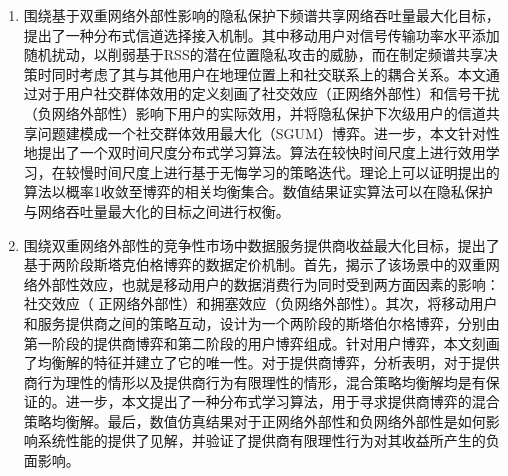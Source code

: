 \begin{enumerate}
   \item 围绕基于双重网络外部性影响的隐私保护下频谱共享网络吞吐量最大化目标，提出了一种分布式信道选择接入机制。其中移动用户对信号传输功率水平添加随机扰动，以削弱基于RSS的潜在位置隐私攻击的威胁，而在制定频谱共享决策时同时考虑了其与其他用户在地理位置上和社交联系上的耦合关系。本文通过对于用户社交群体效用的定义刻画了社交效应（正网络外部性）和信号干扰（负网络外部性）影响下用户的实际效用，并将隐私保护下次级用户的信道共享问题建模成一个社交群体效用最大化（SGUM）博弈。进一步，本文针对性地提出了一个双时间尺度分布式学习算法。算法在较快时间尺度上进行效用学习，在较慢时间尺度上进行基于无悔学习的策略迭代。理论上可以证明提出的算法以概率1收敛至博弈的相关均衡集合。数值结果证实算法可以在隐私保护与网络吞吐量最大化的目标之间进行权衡。
   
  \item 围绕双重网络外部性的竞争性市场中数据服务提供商收益最大化目标，提出了基于两阶段斯塔克伯格博弈的数据定价机制。首先，揭示了该场景中的双重网络外部性效应，也就是移动用户的数据消费行为同时受到两方面因素的影响：社交效应（ 正网络外部性）和拥塞效应（负网络外部性）。其次，将移动用户和服务提供商之间的策略互动，设计为一个两阶段的斯塔伯尔格博弈，分别由第一阶段的提供商博弈和第二阶段的用户博弈组成。针对用户博弈，本文刻画了均衡解的特征并建立了它的唯一性。对于提供商博弈，分析表明，对于提供商行为理性的情形以及提供商行为有限理性的情形，混合策略均衡解均是有保证的。进一步，本文提出了一种分布式学习算法，用于寻求提供商博弈的混合策略均衡解。最后，数值仿真结果对于正网络外部性和负网络外部性是如何影响系统性能的提供了见解，并验证了提供商有限理性行为对其收益所产生的负面影响。
  

\end{enumerate}
